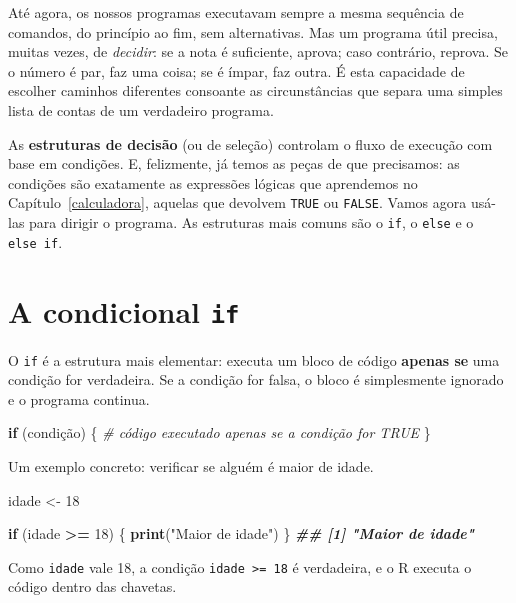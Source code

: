 \documentclass[
  portuguese,
  11pt,
  openany]{book}
\newenvironment{Shaded}{\begin{snugshade}}{\end{snugshade}}
\newcommand{\CommentTok}[1]{\textcolor[rgb]{0.56,0.35,0.01}{\textit{#1}}}
\newcommand{\ControlFlowTok}[1]{\textcolor[rgb]{0.13,0.29,0.53}{\textbf{#1}}}
\newcommand{\DecValTok}[1]{\textcolor[rgb]{0.00,0.00,0.81}{#1}}
\newcommand{\DocumentationTok}[1]{\textcolor[rgb]{0.56,0.35,0.01}{\textbf{\textit{#1}}}}
\newcommand{\FunctionTok}[1]{\textcolor[rgb]{0.13,0.29,0.53}{\textbf{#1}}}
\newcommand{\NormalTok}[1]{#1}
\newcommand{\OtherTok}[1]{\textcolor[rgb]{0.56,0.35,0.01}{#1}}
\newcommand{\SpecialCharTok}[1]{\textcolor[rgb]{0.81,0.36,0.00}{\textbf{#1}}}
\newcommand{\StringTok}[1]{\textcolor[rgb]{0.31,0.60,0.02}{#1}}
\begin{document}
Até agora, os nossos programas executavam sempre a mesma sequência de comandos, do
princípio ao fim, sem alternativas. Mas um programa útil precisa, muitas vezes, de
\emph{decidir}: se a nota é suficiente, aprova; caso contrário, reprova. Se o número é
par, faz uma coisa; se é ímpar, faz outra. É esta capacidade de escolher caminhos
diferentes consoante as circunstâncias que separa uma simples lista de contas de
um verdadeiro programa.

As \textbf{estruturas de decisão} (ou de seleção) controlam o fluxo de execução com
base em condições. E, felizmente, já temos as peças de que precisamos: as
condições são exatamente as expressões lógicas que aprendemos no
Capítulo~\ref{calculadora}, aquelas que devolvem \texttt{TRUE} ou \texttt{FALSE}. Vamos
agora usá-las para dirigir o programa. As estruturas mais comuns são o \texttt{if}, o
\texttt{else} e o \texttt{else\ if}.

\section{\texorpdfstring{A condicional \texttt{if}}{A condicional if}}\label{a-condicional-if}

O \texttt{if} é a estrutura mais elementar: executa um bloco de código \textbf{apenas se} uma
condição for verdadeira. Se a condição for falsa, o bloco é simplesmente ignorado
e o programa continua.

\begin{Shaded}
\begin{Highlighting}[]
\ControlFlowTok{if}\NormalTok{ (condição) \{}
  \CommentTok{\# código executado apenas se a condição for TRUE}
\NormalTok{\}}
\end{Highlighting}
\end{Shaded}

Um exemplo concreto: verificar se alguém é maior de idade.

\begin{Shaded}
\begin{Highlighting}[]
\NormalTok{idade }\OtherTok{\textless{}{-}} \DecValTok{18}

\ControlFlowTok{if}\NormalTok{ (idade }\SpecialCharTok{\textgreater{}=} \DecValTok{18}\NormalTok{) \{}
  \FunctionTok{print}\NormalTok{(}\StringTok{"Maior de idade"}\NormalTok{)}
\NormalTok{\}}
\DocumentationTok{\#\# [1] "Maior de idade"}
\end{Highlighting}
\end{Shaded}

Como \texttt{idade} vale 18, a condição \texttt{idade\ \textgreater{}=\ 18} é verdadeira, e o R executa o
código dentro das chavetas.
\end{document}
